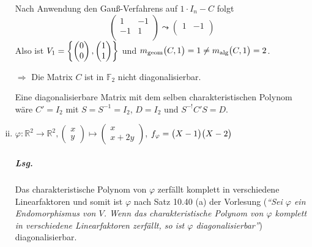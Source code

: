 \documentclass{scrreprt}
\begin{document}
\begin{enumerate}[(i)]
  Nach Anwendung den Gauß-Verfahrens auf $1 \cdot I_n - C$ folgt
  \[
    \begin{pmatrix}
      1 & -1 \\
      -1 & 1 \\
    \end{pmatrix}
    \leadsto
    \begin{pmatrix}
      1 & -1 \\
    \end{pmatrix}    
  \]
  Also ist $V_1 = \qty{
    \begin{pmatrix}0\\0\end{pmatrix},
    \begin{pmatrix}1\\1\end{pmatrix}
  }$ und $m_{\text{geom}}\qty\big(C, 1) = 1 \ne
  m_{\text{alg}}\qty\big(C, 1) = 2$.

  $\Rightarrow$ Die Matrix $C$ ist in $\mathbb{F}_2$ nicht diagonalisierbar.

  Eine diagonalisierbare Matrix mit dem selben charakteristischen Polynom
  wäre $C' = I_2$ mit $S = S^{-1} = I_2$, $D = I_2$ und $S^{-!}C'S = D$.

\item $\varphi \colon \mathbb{R}^2 \to \mathbb{R}^2,
  \begin{pmatrix}x\\y\end{pmatrix} \mapsto \begin{pmatrix}x\\x+2y\end{pmatrix}$,
  $f_{\varphi} = \qty\big(X - 1)\qty\big(X - 2)$

  \subparagraph{Lsg.} Das charakteristische Polynom von $\varphi$ zerfällt komplett in
  verschiedene Linearfaktoren und somit ist $\varphi$ nach Satz 10.40 (a) der Vorlesung
  (\emph{``Sei $\varphi$ ein Endomorphismus von $V$.
    Wenn das charakteristische Polynom von $\varphi$ komplett in verschiedene
    Linearfaktoren zerfällt, so ist $\varphi$ diagonalisierbar''}) diagonalisierbar.
\end{enumerate}
\end{document}
